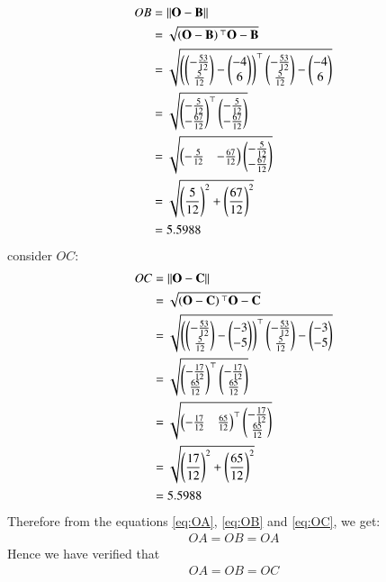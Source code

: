 \documentclass[journal,12pt,twocolumn]{IEEEtran}
\theoremstyle{remark}
\begin{document}
\begin{align} 
OB &= \left\lVert\mathbf{O} - \mathbf{B}\right\rVert\\
&= \sqrt{\left(\mathbf{O}-\mathbf{B}\right){^\top}\mathbf{O}-\mathbf{B}}\\
&= \sqrt{\left(\begin{pmatrix}-\frac{53}{12} \\ \frac{5}{12}\end{pmatrix} - \begin{pmatrix}-4\\6\end{pmatrix}\right)^{\top}\begin{pmatrix}-\frac{53}{12}\\\frac{5}{12}\end{pmatrix} - \begin{pmatrix}-4\\6\end{pmatrix}}\\
&= \sqrt{\begin{pmatrix}-\frac{5}{12} \\ -\frac{67}{12}\end{pmatrix}^{\top}\begin{pmatrix}-\frac{5}{12} \\ -\frac{67}{12}\end{pmatrix}}\\
&= \sqrt{\begin{pmatrix}-\frac{5}{12} & -\frac{67}{12}\end{pmatrix} \begin{pmatrix}-\frac{5}{12} \\ -\frac{67}{12}\end{pmatrix}}\\
&= \sqrt{\left(\frac{5}{12}\right)^2 + \left(\frac{67}{12}\right)^2}\\
&= 5.5988 \label{eq:OB}
\end{align}
consider $OC$:
\begin{align} 
OC &= \left\lVert\mathbf{O} - \mathbf{C}\right\rVert\\
&= \sqrt{\left(\mathbf{O}-\mathbf{C}\right){^\top}\mathbf{O}-\mathbf{C}}\\
&= \sqrt{\left(\begin{pmatrix}-\frac{53}{12} \\ \frac{5}{12}\end{pmatrix} - \begin{pmatrix}-3\\-5\end{pmatrix}\right)^{\top}\begin{pmatrix}-\frac{53}{12}\\\frac{5}{12}\end{pmatrix} - \begin{pmatrix}-3\\-5\end{pmatrix}}\\
&= \sqrt{\begin{pmatrix}-\frac{17}{12} \\ \frac{65}{12}\end{pmatrix}^{\top}\begin{pmatrix}-\frac{17}{12} \\ \frac{65}{12}\end{pmatrix}}\\
&= \sqrt{\begin{pmatrix}-\frac{17}{12} & \frac{65}{12}\end{pmatrix}^{\top}\begin{pmatrix}-\frac{17}{12} \\ \frac{65}{12}\end{pmatrix}}\\
&= \sqrt{\left(\frac{17}{12}\right)^2 + \left(\frac{65}{12}\right)^2}\\
&= 5.5988 \label{eq:OC}
\end{align}
Therefore from the equations \eqref{eq:OA}, \eqref{eq:OB} and \eqref{eq:OC}, we get:
\begin{align}
OA = OB = OA
\end{align}
Hence we have verified that \begin{align} OA = OB = OC \end{align}
\end{document}
